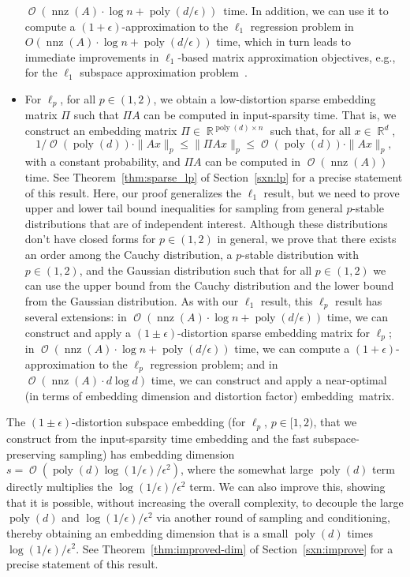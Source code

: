 \documentclass[11pt]{article}
\DeclareMathOperator{\poly}{poly}
\DeclareMathOperator{\bigO}{\mathcal{O}}
\DeclareMathOperator{\nnz}{nnz}
\DeclareMathOperator{\R}{\mathbb{R}}
\begin{document}
\begin{itemize}
  $\bigO(\nnz(A) \cdot \log n + \poly(d/\epsilon))$~time. 
  In addition, we can use it to compute a $(1+\epsilon)$-approximation to the
  $\ell_1$ regression problem in $O(\nnz(A) \cdot \log n + \poly(d/\epsilon))$
  time, which in turn leads to immediate improvements in $\ell_1$-based matrix
  approximation objectives, e.g., for the $\ell_1$ subspace approximation
  problem~\cite{bd09,SW11,CDMMMW13_SODA}.
\item For $\ell_p$, for all $p\in (1,2)$, we obtain a low-distortion sparse
  embedding matrix $\Pi$ such that $\Pi A$ can be computed in input-sparsity
  time.
  That is, we construct an embedding matrix $\Pi \in \R^{\poly(d) \times n}$
  such that, for all $x\in\R^{d}$,
  $$
  1/\bigO(\poly(d)) \cdot \|Ax\|_p \le \|\Pi A x\|_p \le
  \bigO(\poly(d)) \cdot \|Ax\|_p ,
  $$
  with a constant probability, and $\Pi A$ can be computed in $\bigO(\nnz(A))$
  time.
  See Theorem~\ref{thm:sparse_lp} of Section~\ref{sxn:lp} for a precise
  statement of this result.
  Here, our proof generalizes the $\ell_1$ result, but we need to prove upper
  and lower tail bound inequalities for sampling from general $p$-stable
  distributions that are of independent interest.
  Although these distributions don't have closed forms for $p\in(1,2)$ in
  general, we prove that there exists an order among the Cauchy distribution, a
  $p$-stable distribution with $p\in(1,2)$, and the Gaussian distribution such
  that for all $p\in(1,2)$ we can use the upper bound from the Cauchy
  distribution and the lower bound from the Gaussian distribution.
  As with our $\ell_1$ result, this $\ell_p$ result has several extensions: in
  $\bigO(\nnz(A) \cdot \log n + \poly(d/\epsilon))$ time, we can construct and
  apply a $(1\pm\epsilon)$-distortion sparse embedding matrix for $\ell_p$; in
  $\bigO(\nnz(A) \cdot \log n + \poly(d/\epsilon))$ time, we can compute a
  $(1+\epsilon)$-approximation to the $\ell_p$ regression problem; and in
  $\bigO(\nnz(A) \cdot d \log d)$ time, we can construct and apply a
  near-optimal (in terms of embedding dimension and distortion factor) 
  embedding~matrix.
\end{itemize}

\noindent
The $(1\pm\epsilon)$-distortion subspace embedding (for $\ell_p$, $p\in[1,2)$,
that we construct from the input-sparsity time embedding and the fast
subspace-preserving sampling) has embedding dimension $s =
\bigO(\poly(d)\log(1/\epsilon)/\epsilon^2)$, where the somewhat large $\poly(d)$
term directly multiplies the $\log(1/\epsilon)/\epsilon^2$ term. 
We can also improve this, showing that it is possible, without increasing the
overall complexity, to decouple the large $\poly(d)$ and
$\log(1/\epsilon)/\epsilon^2$ via another round of sampling and conditioning,
thereby obtaining an embedding dimension that is a small $\poly(d)$ times
$\log(1/\epsilon)/\epsilon^2$. 
See Theorem~\ref{thm:improved-dim} of Section~\ref{sxn:improve} for a precise
statement of this result.  
\end{document}
